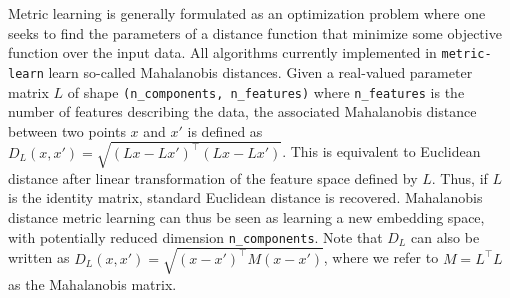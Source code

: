 \documentclass[twoside,11pt]{article}
\begin{document}
Metric learning is generally formulated as an optimization problem where one seeks to find the parameters of a distance function that minimize some objective function over the input data.
All algorithms currently implemented in \texttt{metric-learn} learn so-called Mahalanobis distances. Given a real-valued parameter matrix $L$ of shape \texttt{(n\_components, n\_features)} where \texttt{n\_features} is the
number of features describing the data, the associated Mahalanobis distance between two points $x$ and $x'$ is defined as $D_L(x, x') = \sqrt{(Lx-Lx')^\top(Lx-Lx')}$.
This is equivalent to Euclidean distance after linear transformation of the feature space defined by $L$.
Thus, if $L$ is the identity matrix, standard Euclidean distance is recovered.
Mahalanobis distance metric learning can thus be seen as learning a new
embedding space, with potentially reduced dimension \texttt{n\_components}.
Note that $D_L$ can also be written as $D_L(x, x') = \sqrt{(x - x')^\top M (x - x')}$, where we refer to $M = L^\top L$ as the Mahalanobis matrix.




\end{document}
